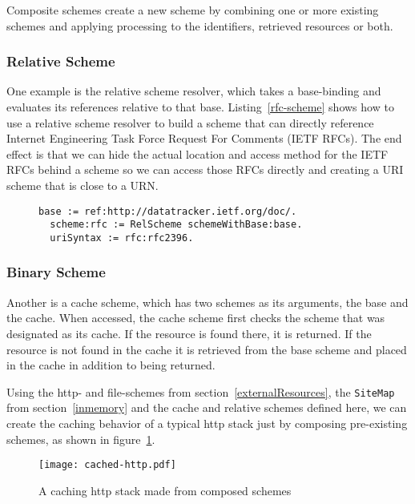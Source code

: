 \documentclass[preprint,authoryear]{acm_proc_article-sp}
\begin{document}
Composite schemes  create a new scheme by combining one or 
more existing schemes and applying processing to the identifiers, retrieved
resources or both.

\subsubsection{Relative Scheme}

One example is the relative scheme resolver, which takes a base-binding
and evaluates its references relative to that base.  Listing~\ref{rfc-scheme} shows
how to use a relative scheme resolver to build a scheme that can directly
reference Internet Engineering Task Force Request For Comments (IETF RFCs).
The end effect is that we can hide the actual location and access method for
the IETF RFCs behind a scheme so we can access those RFCs directly and
creating a URI scheme that is close to a URN.


\begin{figure}[htbp]
\begin{lstlisting}[style=L,label=rfc-scheme,caption=Retrieving RFC 2396 (URI Syntax) via custom rfc: scheme.]
  base := ref:http://datatracker.ietf.org/doc/.
  scheme:rfc := RelScheme schemeWithBase:base.
  uriSyntax := rfc:rfc2396.
\end{lstlisting}
\end{figure}

\subsubsection{Binary Scheme}


Another is a cache scheme, which has two schemes as its arguments,
the base and the cache.  When accessed, the cache scheme first
checks the scheme that was designated as its cache.  If the resource
is found there, it is returned.   If the resource is not found in the cache
it is retrieved from the base scheme and placed in the cache in addition
to being returned.

Using the http- and file-schemes from section~\ref{externalResources}, the
{\tt SiteMap} from section~\ref{inmemory} and the cache and
relative schemes defined here, we can create the 
caching behavior of a typical http stack just by composing
pre-existing schemes, as shown in figure~\ref{http-cached}.


\begin{figure}[htbp]
\label{http-cached}
\begin{center}
\texttt{[image: cached-http.pdf]}
\caption{A caching http stack made from composed schemes}
\end{center}
\end{figure}
\end{document}
